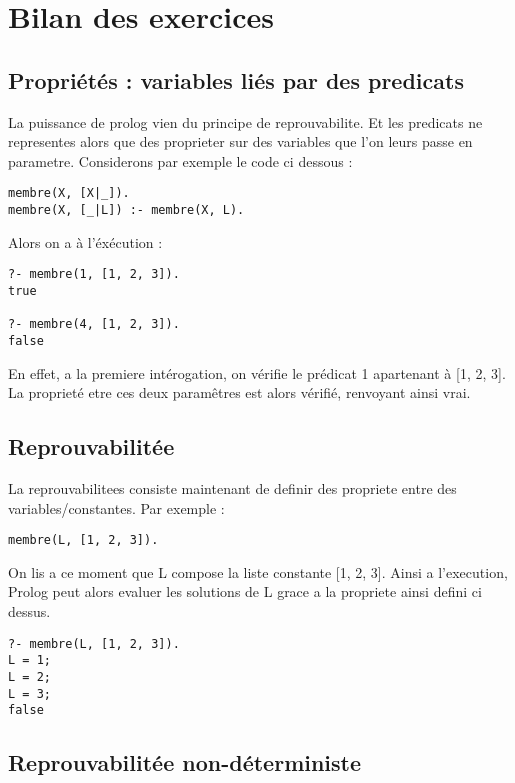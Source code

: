 
\chapter{Bilan des exercices}

\section{Propriétés : variables liés par des predicats}

La puissance de prolog vien du principe de reprouvabilite. Et les predicats ne
representes alors que des proprieter sur des variables que l'on leurs passe en
parametre. Considerons par exemple le code ci dessous :

\begin{lstlisting}
membre(X, [X|_]).
membre(X, [_|L]) :- membre(X, L).
\end{lstlisting}

Alors on a à l'éxécution :

\begin{lstlisting}
?- membre(1, [1, 2, 3]).
true

?- membre(4, [1, 2, 3]).
false
\end{lstlisting}

En effet, a la premiere intérogation, on vérifie le prédicat 1 apartenant à
[1, 2, 3]. La proprieté etre ces deux paramêtres est alors vérifié, renvoyant
ainsi vrai.


\section{Reprouvabilitée}

La reprouvabilitees consiste maintenant de definir des propriete entre des
variables/constantes. Par exemple :

\begin{lstlisting}
membre(L, [1, 2, 3]).
\end{lstlisting}

On lis a ce moment que L compose la liste constante [1, 2, 3]. Ainsi a
l'execution, Prolog peut alors evaluer les solutions de L grace a la propriete
ainsi defini ci dessus.

\begin{lstlisting}
?- membre(L, [1, 2, 3]).
L = 1;
L = 2;
L = 3;
false
\end{lstlisting}


\section{Reprouvabilitée non-déterministe}

